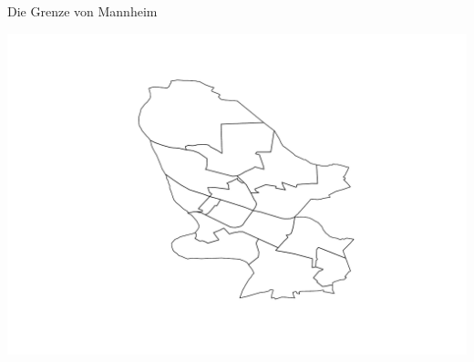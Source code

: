 \documentclass[ignorenonframetext,]{beamer}
\newenvironment{Shaded}{\begin{snugshade}}{\end{snugshade}}
\newcommand{\KeywordTok}[1]{\textcolor[rgb]{0.26,0.66,0.93}{\textbf{#1}}}
\newcommand{\StringTok}[1]{\textcolor[rgb]{0.02,0.61,0.04}{#1}}
\newcommand{\OperatorTok}[1]{\textcolor[rgb]{0.74,0.68,0.62}{#1}}
\newcommand{\NormalTok}[1]{\textcolor[rgb]{0.74,0.68,0.62}{#1}}
\begin{document}
\begin{frame}[fragile]{Die Grenze von Mannheim}

\begin{Shaded}
\end{Shaded}

\includegraphics{Geomedizin_files/figure-beamer/unnamed-chunk-95-1.pdf}

\end{frame}
\end{document}
